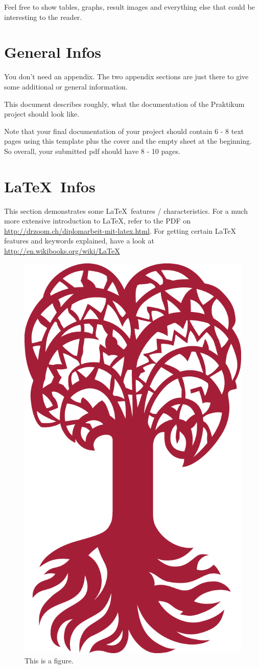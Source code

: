 \documentclass{utue} %
\begin{document}
Feel free to show tables, graphs, result images and everything else that could be interesting to the reader.

\appendix

\section{General Infos}

You don't need an appendix. The two appendix sections are just there to give some additional or general information.

This document describes roughly, what the documentation of the Praktikum project should look like.

Note that your final documentation of your project should contain 6 - 8 text pages using this template plus the cover and the empty sheet at the beginning. So overall, your submitted pdf should have 8 - 10 pages.

\section{\LaTeX~Infos}

This section demonstrates some \LaTeX~features / characteristics. For a much more extensive introduction to \LaTeX, refer to the PDF on \url{http://drzoom.ch/diplomarbeit-mit-latex.html}. For getting certain LaTeX features and keywords explained, have a look at \url{http://en.wikibooks.org/wiki/LaTeX}

\begin{figure}[h!]
  \centering
  \includegraphics[width=.4\columnwidth]{images/Tuebingen_CorporateElements/UT_BM_Rot_RGB_tr_01.png}
  \caption{This is a figure.}
  \label{fig:figure1}
\end{figure}
\end{document}

